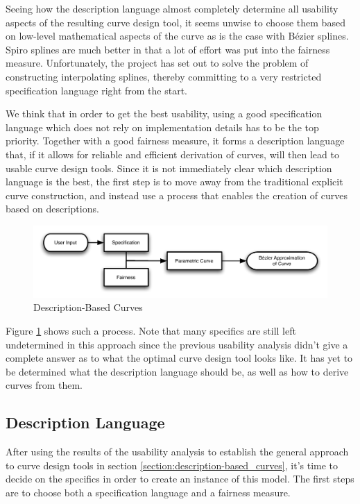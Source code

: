 \documentclass[a4paper]{article}
\begin{document}
			Seeing how the description language almost completely determine all usability aspects of the resulting curve design tool, it seems unwise to choose them based on low-level mathematical aspects of the curve as is the case with Bézier splines. Spiro splines are much better in that a lot of effort was put into the fairness measure. Unfortunately, the project has set out to solve the problem of constructing interpolating splines, thereby committing to a very restricted specification language right from the start.

			We think that in order to get the best usability, using a good specification language which does not rely on implementation details has to be the top priority. Together with a good fairness measure, it forms a description language that, if it allows for reliable and efficient derivation of curves, will then lead to usable curve design tools. Since it is not immediately clear which description language is the best, the first step is to move away from the traditional explicit curve construction, and instead use a process that enables the creation of curves based on descriptions.

			\begin{figure}[htb]
				\centering
				\includegraphics[width=\textwidth]{../resources/description-based_curves.pdf}
				\caption{Description-Based Curves}
				\label{figure:description-based_curves}
			\end{figure}

			Figure \ref{figure:description-based_curves} shows such a process. Note that many specifics are still left undetermined in this approach since the previous usability analysis didn't give a complete answer as to what the optimal curve design tool looks like. It has yet to be determined what the description language should be, as well as how to derive curves from them.

		\subsection{Description Language}
		\label{section:description_language}
			
			After using the results of the usability analysis to establish the general approach to curve design tools in section \ref{section:description-based_curves}, it's time to decide on the specifics in order to create an instance of this model. The first steps are to choose both a specification language and a fairness measure.
\end{document}
